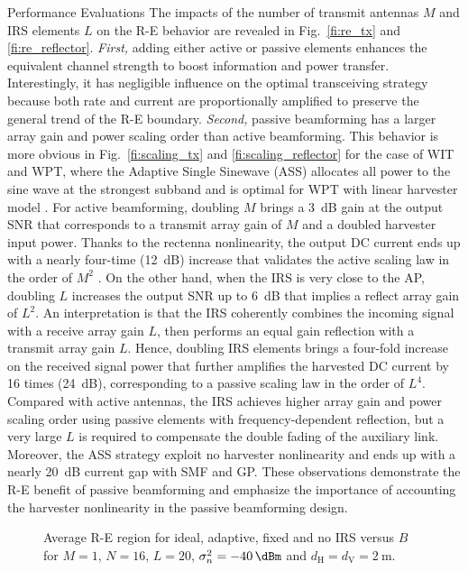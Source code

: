 \documentclass[journal]{IEEEtran}
\begin{document}
\begin{section}{Performance Evaluations}
		The impacts of the number of transmit antennas $M$ and IRS elements $L$ on the R-E behavior are revealed in Fig.~\ref{fi:re_tx} and \ref{fi:re_reflector}. \emph{First,} adding either active or passive elements enhances the equivalent channel strength to boost information and power transfer. Interestingly, it has negligible influence on the optimal transceiving strategy because both rate and current are proportionally amplified to preserve the general trend of the R-E boundary. \emph{Second,} passive beamforming has a larger array gain and power scaling order than active beamforming. This behavior is more obvious in Fig.~\ref{fi:scaling_tx} and \ref{fi:scaling_reflector} for the case of WIT and WPT, where the Adaptive Single Sinewave (ASS) allocates all power to the sine wave at the strongest subband and is optimal for WPT with linear harvester model \cite{Clerckx2016a}. For active beamforming, doubling $M$ brings a \SI{3}{\dB} gain at the output SNR that corresponds to a transmit array gain of $M$ and a doubled harvester input power. Thanks to the rectenna nonlinearity, the output DC current ends up with a nearly four-time (\SI{12}{\dB}) increase that validates the active scaling law in the order of $M^2$ \cite{Clerckx2016a}. On the other hand, when the IRS is very close to the AP, doubling $L$ increases the output SNR up to \SI{6}{\dB} that implies a reflect array gain of $L^2$. An interpretation is that the IRS coherently combines the incoming signal with a receive array gain $L$, then performs an equal gain reflection with a transmit array gain $L$. Hence, doubling IRS elements brings a four-fold increase on the received signal power that further amplifies the harvested DC current by \num{16} times (\SI{24}{\dB}), corresponding to a passive scaling law in the order of $L^4$. Compared with active antennas, the IRS achieves higher array gain and power scaling order using passive elements with frequency-dependent reflection, but a very large $L$ is required to compensate the double fading of the auxiliary link. Moreover, the ASS strategy exploit no harvester nonlinearity and ends up with a nearly \SI{20}{\dB} current gap with SMF and GP. These observations demonstrate the R-E benefit of passive beamforming and emphasize the importance of accounting the harvester nonlinearity in the passive beamforming design.

		\begin{figure}[!t]
			\centering
			\subfloat[$B=\SI{1}{\MHz}$\label{fi:re_irs_1mhz}]{
				\resizebox{0.45\columnwidth}{!}{
					
				}
			}
			\subfloat[$B=\SI{10}{\MHz}$\label{fi:re_irs_10mhz}]{
				\resizebox{0.45\columnwidth}{!}{
					
				}
			}
			\caption{Average R-E region for ideal, adaptive, fixed and no IRS versus $B$ for $M=1$, $N=16$, $L=20$, $\sigma_n^2=\SI{-40}{\dBm}$ and $d_{\mathrm{H}}=d_{\mathrm{V}}=\SI{2}{\meter}$.}
		\end{figure}


\end{section}
\end{document}
